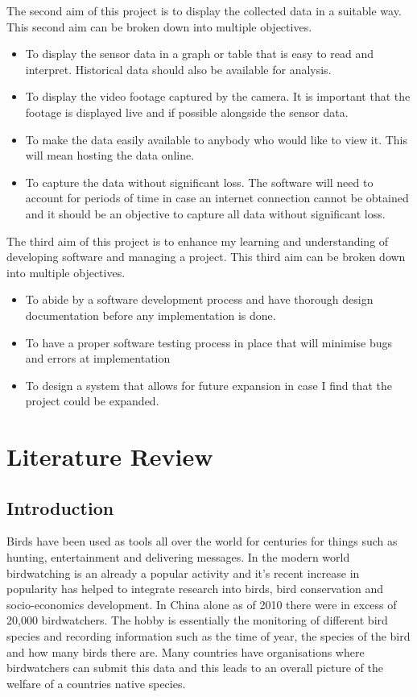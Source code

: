\documentclass[10pt,a4paper]{article}
\begin{document}
The second aim of this project is to display the collected data in a suitable way. This second aim can be broken down into multiple objectives.
\begin{itemize}
\item To display the sensor data in a graph or table that is easy to read and interpret. Historical data should also be available for analysis. 

\item To display the video footage captured by the camera. It is important that the footage is displayed live and if possible alongside the sensor data. 

\item To make the data easily available to anybody who would like to view it. This will mean hosting the data online. 

\item To capture the data without significant loss. The software will need to account for periods of time in case an internet connection cannot be obtained and it should be an objective to capture all data without significant loss. 
\end{itemize}

The third aim of this project is to enhance my learning and understanding of developing software and managing a project. This third aim can be broken down into multiple objectives. 
\begin{itemize}
\item To abide by a software development process and have thorough design documentation before any implementation is done. 

\item To have a proper software testing process in place that will minimise bugs and errors at implementation

\item To design a system that allows for future expansion in case I find that the project could be expanded. 
\end{itemize}

\pagebreak
\section{Literature Review}
\subsection{Introduction}
Birds have been used as tools all over the world for centuries for things such as hunting, entertainment and delivering messages. In the modern world birdwatching is an already a popular activity and it's recent increase in popularity has helped to integrate research into birds, bird conservation and socio-economics development\cite{Zhijun2013}. In China alone as of 2010 there were in excess of 20,000 birdwatchers\cite{Zhijun2013}. The hobby is essentially the monitoring of different bird species and recording information such as the time of year, the species of the bird and how many birds there are. Many countries have organisations where birdwatchers can submit this data and this leads to an overall picture of the welfare of a countries native species.
\end{document}
